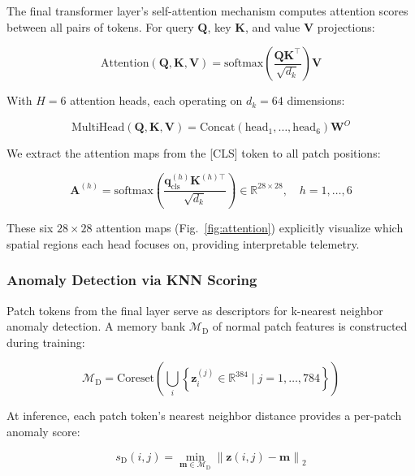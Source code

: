 \documentclass[journal]{IEEEtran}
\begin{document}
The final transformer layer's self-attention mechanism computes attention scores between all pairs of tokens. For query $\mathbf{Q}$, key $\mathbf{K}$, and value $\mathbf{V}$ projections:

\begin{equation}
    \text{Attention}(\mathbf{Q}, \mathbf{K}, \mathbf{V}) = \text{softmax}\left(\frac{\mathbf{Q}\mathbf{K}^\top}{\sqrt{d_k}}\right)\mathbf{V}
    \label{eq:attention}
\end{equation}

With $H = 6$ attention heads, each operating on $d_k = 64$ dimensions:

\begin{equation}
    \text{MultiHead}(\mathbf{Q}, \mathbf{K}, \mathbf{V}) = \text{Concat}(\text{head}_1, \ldots, \text{head}_6)\mathbf{W}^O
    \label{eq:multihead}
\end{equation}

We extract the attention maps from the [CLS] token to all patch positions:

\begin{equation}
    \mathbf{A}^{(h)} = \text{softmax}\left(\frac{\mathbf{q}_{\text{cls}}^{(h)} \mathbf{K}^{(h)\top}}{\sqrt{d_k}}\right) \in \mathbb{R}^{28 \times 28}, \quad h = 1,\ldots,6
    \label{eq:attn_maps}
\end{equation}

These six $28 \times 28$ attention maps (Fig.~\ref{fig:attention}) explicitly visualize which spatial regions each head focuses on, providing interpretable telemetry.

\subsubsection{Anomaly Detection via KNN Scoring}

Patch tokens from the final layer serve as descriptors for k-nearest neighbor anomaly detection. A memory bank $\mathcal{M}_{\text{D}}$ of normal patch features is constructed during training:

\begin{equation}
    \mathcal{M}_{\text{D}} = \text{Coreset}\left(\bigcup_{i} \left\{\mathbf{z}_i^{(j)} \in \mathbb{R}^{384} \;|\; j = 1,\ldots,784\right\}\right)
    \label{eq:dino_bank}
\end{equation}

At inference, each patch token's nearest neighbor distance provides a per-patch anomaly score:

\begin{equation}
    s_{\text{D}}(i, j) = \min_{\mathbf{m} \in \mathcal{M}_{\text{D}}} \left\| \mathbf{z}(i, j) - \mathbf{m} \right\|_2
    \label{eq:dino_knn}
\end{equation}
\end{document}
